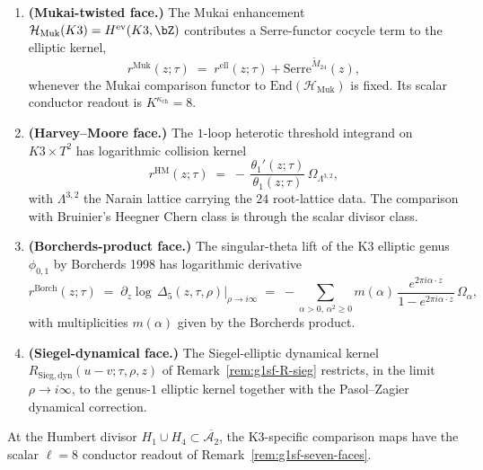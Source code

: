 \begin{proposition}
\begin{enumerate}
\eqref{eq:g1sf-phi-pm}; this is the K3 restriction of Face~$5$.
\item \textbf{(Mukai-twisted face.)} The Mukai enhancement
$\mathcal{H}_{\mathrm{Muk}}(K3)=H^{\mathrm{ev}}(K3,\bZ)$ contributes a
Serre-functor cocycle term to the elliptic kernel,
\[
 r^{\mathrm{Muk}}(z; \tau) \;=\; r^{\mathrm{ell}}(z;\tau) + \mathrm{Serre}^{\widetilde{M}_{24}}(z),
\]
whenever the Mukai comparison functor to
$\mathrm{End}(\mathcal{H}_{\mathrm{Muk}})$ is fixed. Its scalar
conductor readout is $K^{\kappa_{\mathrm{ch}}}=8$.
\item \textbf{(Harvey--Moore face.)} The $1$-loop heterotic
threshold integrand on $K3\times T^2$
\cite{HarveyMoore1996} has logarithmic collision kernel
\[
 r^{\mathrm{HM}}(z;\tau)
 \;=\;
 -\,\frac{\theta_1'(z;\tau)}{\theta_1(z;\tau)}\,\Omega_{\Lambda^{3,2}},
\]
with $\Lambda^{3,2}$ the Narain lattice carrying the $24$ root-lattice
data. The comparison with Bruinier's Heegner Chern class is through
the scalar divisor class.
\item \textbf{(Borcherds-product face.)} The singular-theta lift of
the K3 elliptic genus $\phi_{0,1}$ by Borcherds 1998 has logarithmic
derivative
\[
 r^{\mathrm{Borch}}(z;\tau)
 \;=\;
 \partial_z \log\,\Delta_5(z,\tau,\rho)\bigl|_{\rho\to i\infty}
 \;=\;
 -\sum_{\alpha>0,\,\alpha^2\geq 0} m(\alpha)\,
 \frac{e^{2\pi i\alpha\cdot z}}{1 - e^{2\pi i\alpha\cdot z}}\,\Omega_\alpha,
\]
with multiplicities $m(\alpha)$ given by the Borcherds product.
\item \textbf{(Siegel-dynamical face.)} The
Siegel-elliptic dynamical kernel
$R_{\mathrm{Sieg,dyn}}(u-v; \tau,\rho,z)$ of
Remark~\ref{rem:g1sf-R-sieg} restricts, in the limit
$\rho\to i\infty$, to the genus-$1$ elliptic kernel together with the
Pasol--Zagier dynamical correction.
\end{enumerate}
At the Humbert divisor $H_1\cup H_4\subset\overline{\mathcal{A}_2}$,
the K3-specific comparison maps have the scalar $\ell=8$ conductor
readout of Remark~\ref{rem:g1sf-seven-faces}.
\end{proposition}

